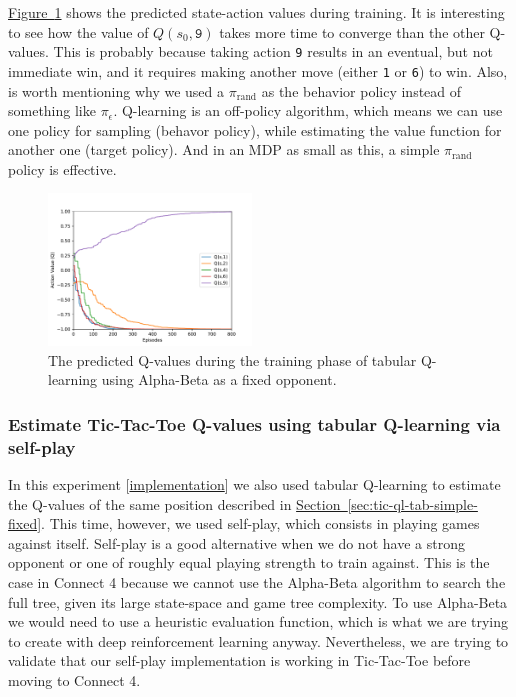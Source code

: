 \documentclass{article}
\newcommand{\GithubURL}[1]{[\href{https://github.com/davidrobles/mlnd-capstone-code/blob/master/#1}{implementation}]}
\begin{document}
\hyperref[fig:tic-ql-tab-qvalues-progress] {Figure~\ref*{fig:tic-ql-tab-qvalues-progress}} shows the
predicted state-action values during training. It is interesting to see how the value of $Q(s_0,
\texttt{9})$ takes more time to converge than the other Q-values. This is probably because taking
action \texttt{9} results in an eventual, but not immediate win, and it requires making another move
(either \texttt{1} or \texttt{6}) to win. Also, is worth mentioning why we used a
$\pi_{\textrm{rand}}$ as the behavior policy instead of something like $\pi_{\epsilon}$. Q-learning
is an off-policy algorithm, which means we can use one policy for sampling (behavor policy), while
estimating the value function for another one (target policy). And in an MDP as small as this, a
simple $\pi_{\textrm{rand}}$ policy is effective.


\begin{figure}[!h]
    \centering
    \includegraphics[width=0.48\textwidth]{figures/tic_ql_tab_action_values.pdf}
    \caption{The predicted Q-values during the training phase of tabular
             Q-learning using Alpha-Beta as a fixed opponent.}
    \label{fig:tic-ql-tab-qvalues-progress}
\end{figure}

\subsubsection{Estimate Tic-Tac-Toe Q-values using tabular Q-learning via self-play}

In this experiment \GithubURL{experiments/tic_ql_tab_simple_selfplay.py} we also used tabular
Q-learning to estimate the Q-values of the same position described in
\hyperref[sec:tic-ql-tab-simple-fixed] {Section~\ref*{sec:tic-ql-tab-simple-fixed}}. This time,
however, we used self-play, which consists in playing games against itself. Self-play is a good
alternative when we do not have a strong opponent or one of roughly equal playing strength to train
against. This is the case in Connect 4 because we cannot use the Alpha-Beta algorithm to search the
full tree, given its large state-space and game tree complexity. To use Alpha-Beta we would need to
use a heuristic evaluation function, which is what we are trying to create with deep reinforcement
learning anyway. Nevertheless, we are trying to validate that our self-play implementation is
working in Tic-Tac-Toe before moving to Connect 4.
\end{document}

